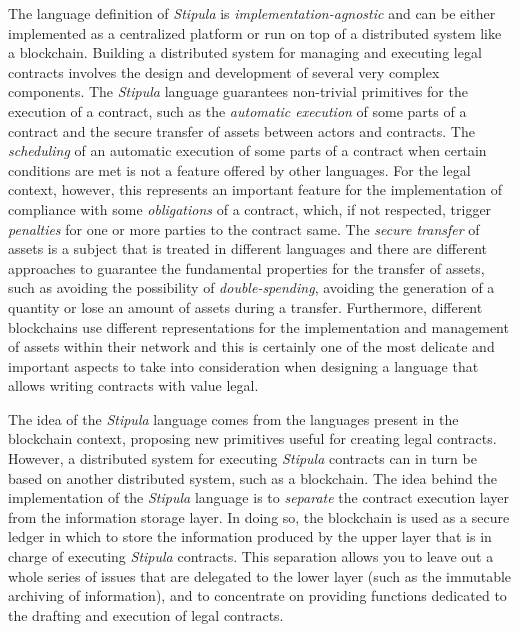 The language definition of \textit{Stipula} is \textit{implementation-agnostic} and can be either 
implemented as a centralized platform or run on top of a distributed system like a blockchain. 
Building a distributed system for managing and executing legal contracts involves the design and 
development of several very complex components. The \textit{Stipula} language guarantees non-trivial 
primitives for the execution of a contract, such as the \textit{automatic execution} of some parts of a 
contract and the secure transfer of assets between actors and contracts. The \textit{scheduling} of an 
automatic execution of some parts of a contract when certain conditions are met is not a feature offered 
by other languages. For the legal context, however, this represents an important feature for the 
implementation of compliance with some \textit{obligations} of a contract, which, if not respected, trigger 
\textit{penalties} for one or more parties to the contract same. The \textit{secure transfer} of assets 
is a subject that is treated in different languages and there are different approaches to guarantee the 
fundamental properties for the transfer of assets, such as avoiding the possibility of 
\textit{double-spending}, avoiding the generation of a quantity or lose an amount of assets during a 
transfer. Furthermore, different blockchains use different representations for the implementation and 
management of assets within their network and this is certainly one of the most delicate and important 
aspects to take into consideration when designing a language that allows writing contracts with value 
legal.

The idea of the \textit{Stipula} language comes from the languages present in the blockchain context, 
proposing new primitives useful for creating legal contracts. However, a distributed system for executing 
\textit{Stipula} contracts can in turn be based on another distributed system, such as a blockchain. The 
idea behind the implementation of the \textit{Stipula} language is to \textit{separate} the contract 
execution layer from the information storage layer. In doing so, the blockchain is used as a secure 
ledger in which to store the information produced by the upper layer that is in charge of executing 
\textit{Stipula} contracts. This separation allows you to leave out a whole series of issues that are delegated to the lower layer (such as the immutable archiving of information), and to concentrate on providing functions dedicated to the drafting and execution of legal contracts.

